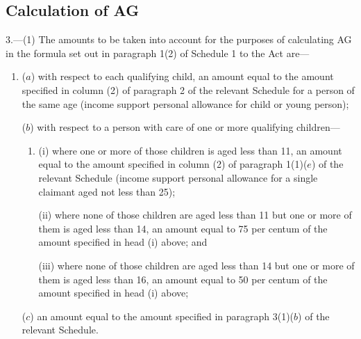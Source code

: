 \documentclass[12pt,a4paper]{article}
\begin{document}
\subsection[3. Calculation of AG]{Calculation of AG}

3.—(1) The amounts to be taken into account for the purposes of calculating AG in the formula set out in paragraph 1(2) of Schedule 1 to the Act are—
\begin{enumerate}\item[]
($a$) with respect to each qualifying child, an amount equal to the amount specified in column (2) of paragraph 2 of the relevant Schedule for a person of the same age (income support personal allowance for child or young person);


($b$) with respect to a person with care of one or more qualifying children—
\begin{enumerate}\item[]
(i) where one or more of those children is aged less than 11, an amount equal to the amount specified in column (2) of paragraph 1(1)($e$) of the relevant Schedule (income support personal allowance for a single claimant aged not less than 25);

(ii) where none of those children are aged less than 11 but one or more of them is aged less than 14, an amount equal to 75 per centum of the amount specified in head (i) above; and

(iii) where none of those children are aged less than 14 but one or more of them is aged less than 16, an amount equal to 50 per centum of the amount specified in head (i) above;
\end{enumerate} %


%

($c$) an amount equal to the amount specified in paragraph 3(1)($b$) of the relevant Schedule.

\end{enumerate}
\end{document}
